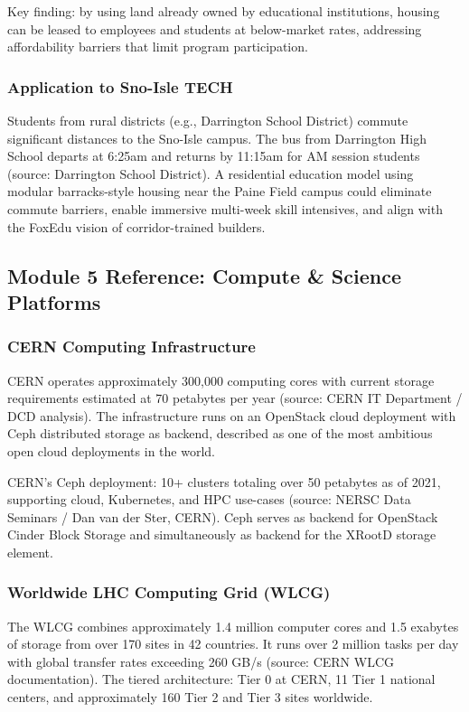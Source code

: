 \documentclass[11pt,letterpaper]{article}
\begin{document}
Key finding: by using land already owned by educational institutions, housing can be leased to employees and students at below-market rates, addressing affordability barriers that limit program participation.

\subsubsection{Application to Sno-Isle TECH}

Students from rural districts (e.g., Darrington School District) commute significant distances to the Sno-Isle campus. The bus from Darrington High School departs at 6:25am and returns by 11:15am for AM session students (source: Darrington School District). A residential education model using modular barracks-style housing near the Paine Field campus could eliminate commute barriers, enable immersive multi-week skill intensives, and align with the FoxEdu vision of corridor-trained builders.

\subsection{Module 5 Reference: Compute \& Science Platforms}

\subsubsection{CERN Computing Infrastructure}

CERN operates approximately 300,000 computing cores with current storage requirements estimated at 70 petabytes per year (source: CERN IT Department / DCD analysis). The infrastructure runs on an OpenStack cloud deployment with Ceph distributed storage as backend, described as one of the most ambitious open cloud deployments in the world.

CERN's Ceph deployment: 10+ clusters totaling over 50 petabytes as of 2021, supporting cloud, Kubernetes, and HPC use-cases (source: NERSC Data Seminars / Dan van der Ster, CERN). Ceph serves as backend for OpenStack Cinder Block Storage and simultaneously as backend for the XRootD storage element.

\subsubsection{Worldwide LHC Computing Grid (WLCG)}

The WLCG combines approximately 1.4 million computer cores and 1.5 exabytes of storage from over 170 sites in 42 countries. It runs over 2 million tasks per day with global transfer rates exceeding 260 GB/s (source: CERN WLCG documentation). The tiered architecture: Tier 0 at CERN, 11 Tier 1 national centers, and approximately 160 Tier 2 and Tier 3 sites worldwide.
\end{document}
